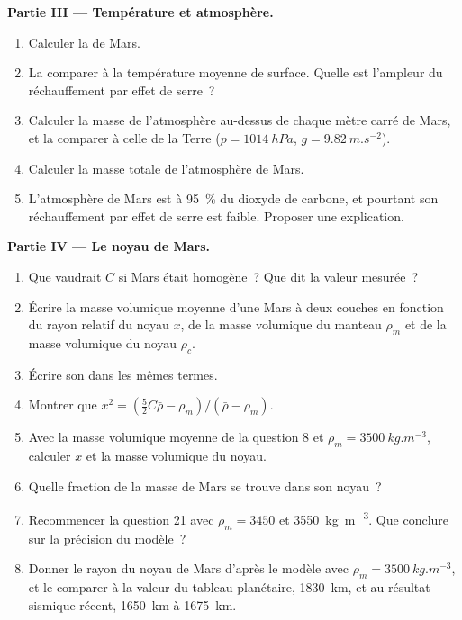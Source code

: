 \begin{problem}
\medskip
\noindent\textbf{Partie III --- Température et atmosphère.}
\begin{enumerate}[resume]
  \item Calculer la  de Mars.
  \item La comparer à la température moyenne de surface. Quelle est l'ampleur
        du réchauffement par effet de serre~?
  \item Calculer la masse de l'atmosphère au-dessus de chaque mètre carré de
        Mars, et la comparer à celle de la Terre ($p = \qty{1014}{hPa}$,
        $g = \qty{9.82}{m.s^{-2}}$).
  \item Calculer la masse totale de l'atmosphère de Mars.
  \item L'atmosphère de Mars est à \qty{95}{\percent} du dioxyde de carbone, et
        pourtant son réchauffement par effet de serre est faible. Proposer une
        explication.
\end{enumerate}

\medskip
\noindent\textbf{Partie IV --- Le noyau de Mars.}
\begin{enumerate}[resume]
  \item Que vaudrait $C$ si Mars était homogène~? Que dit la valeur mesurée~?
  \item Écrire la masse volumique moyenne d'une Mars à deux couches en fonction
        du rayon relatif du noyau $x$, de la masse volumique du manteau $\rho_m$
        et de la masse volumique du noyau $\rho_c$.
  \item Écrire son  dans les mêmes termes.
  \item Montrer que $x^2 = (\tfrac52C\bar\rho - \rho_m)/(\bar\rho - \rho_m)$.
  \item Avec la masse volumique moyenne de la question 8 et $\rho_m =
        \qty{3500}{kg.m^{-3}}$, calculer $x$ et la masse volumique du noyau.
  \item Quelle fraction de la masse de Mars se trouve dans son noyau~?
  \item Recommencer la question 21 avec $\rho_m = 3450$ et
        \qty{3550}{kg.m^{-3}}. Que conclure sur la précision du modèle~?
  \item Donner le rayon du noyau de Mars d'après le modèle avec
        $\rho_m = \qty{3500}{kg.m^{-3}}$, et le comparer à la valeur du tableau
        planétaire, \qty{1830}{km}, et au résultat sismique récent,
        \qty{1650}{km} à \qty{1675}{km}.
\end{enumerate}
\end{problem}
